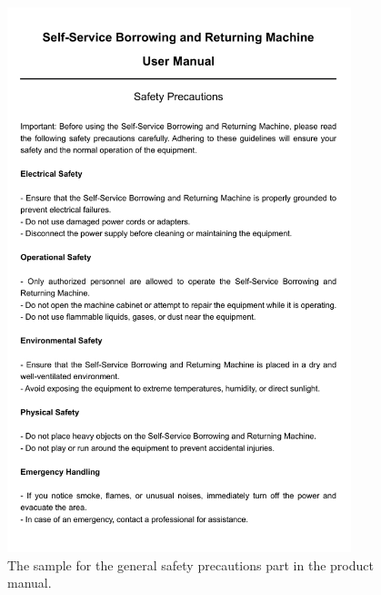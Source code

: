 \documentclass[preprint,12pt]{elsarticle}
\begin{document}
\begin{figure}[!h]
	\centering
	\includegraphics[angle=90,width=10cm]{safety_pre.jpg}
	\caption{The  sample for the general safety precautions part in the product manual.}
	\label{safety_pre}
\end{figure}
\end{document}
